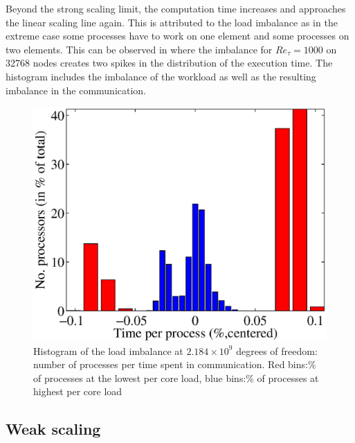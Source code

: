 \documentclass{sig-alternate}
\begin{document}
Beyond the strong scaling limit, the computation time increases and
approaches the linear scaling line again. This is attributed to the load
imbalance as in the extreme case some processes have to work on one element and
some processes on two elements. This can be observed in
where the imbalance for $Re_{\tau}=1000$ on 32768 nodes creates two spikes in the
distribution of the execution time. The histogram includes the imbalance of
the workload as well as the resulting imbalance in the communication.
\begin{figure}
  \centering
  \includegraphics[width=\linewidth]{./figures/loadbalance.eps}
  \caption{Histogram of the load imbalance at $2.184\times10^9$ degrees of freedom: number of processes per time spent in communication. Red bins:\% of processes at the lowest per core load, blue bins:\% of processes at highest per core load}
  \label{fig:imbalancehist}
\end{figure}

\subsection{Weak scaling}
\end{document}
